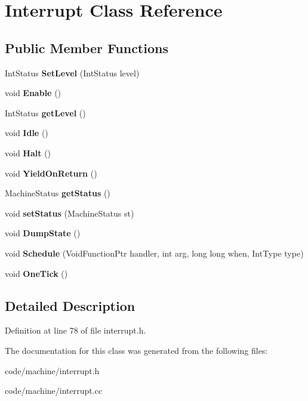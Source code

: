 \section{Interrupt Class Reference}
\label{class_interrupt}
\subsection*{Public Member Functions}
\begin{DoxyCompactItemize}
\item 
Int\+Status {\bfseries Set\+Level} (Int\+Status level)\label{class_interrupt_af55a6cea64a8a3de49bad9ea3843addb}

\item 
void {\bfseries Enable} ()\label{class_interrupt_a16eca26a7162f7099e5b043d0c0de344}

\item 
Int\+Status {\bfseries get\+Level} ()\label{class_interrupt_aa519deead8b512a52ba4ad9fb0e2643b}

\item 
void {\bfseries Idle} ()\label{class_interrupt_ace54aece18806bae3614ebf9cc8c2991}

\item 
void {\bfseries Halt} ()\label{class_interrupt_a4d9820efbc3e9fd82e82f2eb6ef3613b}

\item 
void {\bfseries Yield\+On\+Return} ()\label{class_interrupt_a2dd7548881fde3cf3c8fba4d75437849}

\item 
Machine\+Status {\bfseries get\+Status} ()\label{class_interrupt_a6b240d463c36d4dcb18c444d4f71b778}

\item 
void {\bfseries set\+Status} (Machine\+Status st)\label{class_interrupt_a35a3cf7b10315addeee6ed0730225d57}

\item 
void {\bfseries Dump\+State} ()\label{class_interrupt_a8f9a7ddd0f250de0dcd45fa5bfd80c11}

\item 
void {\bfseries Schedule} (Void\+Function\+Ptr handler, int arg, long long when, Int\+Type type)\label{class_interrupt_a78dd8c83735e5e73c056e87f3a47d3cb}

\item 
void {\bfseries One\+Tick} ()\label{class_interrupt_af7e385b28c374d35c4ca3763efac2b33}

\end{DoxyCompactItemize}


\subsection{Detailed Description}


Definition at line 78 of file interrupt.\+h.



The documentation for this class was generated from the following files\+:\begin{DoxyCompactItemize}
\item 
code/machine/interrupt.\+h\item 
code/machine/interrupt.\+cc\end{DoxyCompactItemize}

